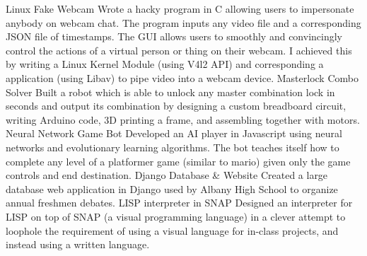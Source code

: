 


\begin{cvskills}

  \vspace{1mm}
  \cvskill
    {Linux Fake Webcam} %
    {Wrote a hacky program in C allowing users to impersonate anybody on webcam chat. The program inputs any video file and a corresponding JSON file of timestamps. The GUI allows users to smoothly and convincingly control the actions of a virtual person or thing on their webcam. I achieved this by writing a Linux Kernel Module (using V4l2 API) and corresponding a application (using Libav) to pipe video into a webcam device.} %
  \vspace{1mm}
\cvskill
    {Masterlock Combo Solver} %
    {Built a robot which is able to unlock any master combination lock in seconds and output its combination by designing a custom breadboard circuit, writing Arduino code, 3D printing a frame, and assembling together with motors.} %
  \vspace{1mm}
\cvskill
  {Neural Network Game Bot}
  {Developed an AI player in Javascript using neural networks and evolutionary learning algorithms. The bot teaches itself how to complete any level of a platformer game (similar to mario) given only the game controls and end destination.}
  \vspace{1mm}
  \cvskill
    {Django Database \& Website} %
    {Created a large database web application in Django used by Albany High School to organize annual freshmen debates.} %
  \cvskill
    {LISP interpreter in SNAP} %
    {Designed an interpreter for LISP on top of SNAP (a visual programming language) in a clever attempt to loophole the requirement of using a visual language for in-class projects, and instead using a written language.} %
  \vspace{1mm}

\end{cvskills}
